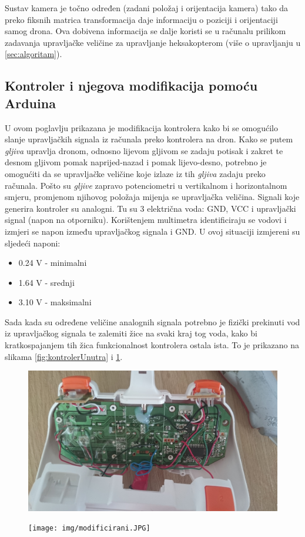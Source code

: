 \documentclass[times, utf8, diplomski]{fer}
\begin{document}
Sustav kamera je točno određen (zadani položaj i orijentacija kamera) tako da preko fiksnih matrica transformacija daje informaciju o poziciji i orijentaciji samog drona. Ova dobivena informacija se dalje koristi se u računalu prilikom zadavanja upravljačke veličine za upravljanje heksakopterom (više o upravljanju u \ref{sec:algoritam}).

\subsection{Kontroler i njegova modifikacija pomoću Arduina}\label{sec:kontroler}
U ovom poglavlju prikazana je modifikacija kontrolera kako bi se omogućilo slanje upravljačkih signala iz računala preko kontrolera na dron. Kako se putem \emph{gljiva} upravlja dronom, odnosno lijevom gljivom se zadaju potisak  i zakret  te desnom gljivom pomak naprijed-nazad i pomak lijevo-desno, potrebno je omogućiti da se upravljačke veličine koje izlaze iz tih \emph{gljiva} zadaju preko računala. Pošto su \emph{gljive} zapravo potenciometri u vertikalnom i horizontalnom smjeru, promjenom njihovog položaja mijenja se  upravljačka veličina. Signali koje generira kontroler su analogni. Tu su 3 električna voda: GND, VCC i upravljački signal (napon na otporniku). Korištenjem multimetra identificiraju se vodovi i izmjeri se napon između upravljačkog signala i GND. U ovoj situaciji izmjereni su sljedeći naponi:
\begin{itemize}
\item 0.24 V - minimalni
\item 1.64 V - srednji
\item 3.10 V - maksimalni
\end{itemize}
Sada kada su određene veličine analognih signala potrebno je fizički prekinuti vod iz upravljačkog signala te zalemiti žice na svaki kraj tog voda, kako bi kratkospajanjem tih žica funkcionalnost kontrolera ostala ista.  To je prikazano na slikama  \ref{fig:kontrolerUnutra} i \ref{fig:kontrolerVani}.
\begin{figure}[htb]
\centering
\begin{minipage}{.6\textwidth}
  \centering
  \includegraphics[width=.8\linewidth]{img/modificiranje.JPG}
  \label{fig:kontrolerUnutra}
\end{minipage}%
\begin{minipage}{.4\textwidth}
  \centering
  \texttt{[image: img/modificirani.JPG]}
  \label{fig:kontrolerVani}
\end{minipage}
\end{figure}\\
\end{document}
